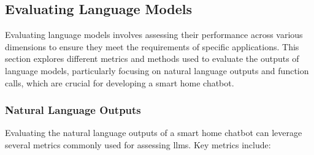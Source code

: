 \subsection{Evaluating Language Models}
Evaluating language models involves assessing their performance across various dimensions to ensure they meet the requirements of specific applications. This section explores different metrics and methods used to evaluate the outputs of language models, particularly focusing on natural language outputs and function calls, which are crucial for developing a smart home chatbot.

\subsubsection{Natural Language Outputs}
Evaluating the natural language outputs of a smart home chatbot can leverage several metrics commonly used for assessing \glspl{llm}. Key metrics include:

